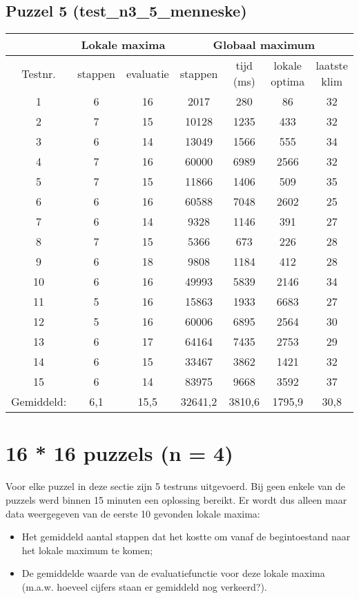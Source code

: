 \documentclass[]{report}
\begin{document}
\begin{appendices}
\subsection{Puzzel 5 (test\_n3\_5\_menneske)}
\begin{tabular}{|c||c|c||c|c|c|c|}
\hline  & \multicolumn{2}{|c||}{Lokale maxima} & \multicolumn{4}{|c|}{Globaal maximum}  \\ 
\hline Testnr. & stappen & evaluatie & stappen & tijd (ms) & lokale optima & laatste klim \\ 
\hline \hline	1	&	6	&	16	&	2017	&	280	&	86	&	32	\\
\hline	2	&	7	&	15	&	10128	&	1235	&	433	&	32	\\
\hline	3	&	6	&	14	&	13049	&	1566	&	555	&	34	\\
\hline	4	&	7	&	16	&	60000	&	6989	&	2566	&	32	\\
\hline	5	&	7	&	15	&	11866	&	1406	&	509	&	35	\\
\hline	6	&	6	&	16	&	60588	&	7048	&	2602	&	25	\\
\hline	7	&	6	&	14	&	9328	&	1146	&	391	&	27	\\
\hline	8	&	7	&	15	&	5366	&	673	&	226	&	28	\\
\hline	9	&	6	&	18	&	9808	&	1184	&	412	&	28	\\
\hline	10	&	6	&	16	&	49993	&	5839	&	2146	&	34	\\
\hline	11	&	5	&	16	&	15863	&	1933	&	6683	&	27	\\
\hline	12	&	5	&	16	&	60006	&	6895	&	2564	&	30	\\
\hline	13	&	6	&	17	&	64164	&	7435	&	2753	&	29	\\
\hline	14	&	6	&	15	&	33467	&	3862	&	1421	&	32	\\
\hline	15	&	6	&	14	&	83975	&	9668	&	3592	&	37	\\
\hline \hline Gemiddeld: & 6,1 & 15,5 & 32641,2 & 3810,6 & 1795,9 & 30,8 \\ 
\hline 
\end{tabular}
\section{16 * 16 puzzels (n = 4)}
Voor elke puzzel in deze sectie zijn 5 testruns uitgevoerd. Bij geen enkele van de puzzels werd binnen 15 minuten een oplossing bereikt. Er wordt dus alleen maar data weergegeven van de eerste 10 gevonden lokale maxima:
\begin{itemize}
\item Het gemiddeld aantal stappen dat het kostte om vanaf de begintoestand naar het lokale maximum te komen;
\item De gemiddelde waarde van de evaluatiefunctie voor deze lokale maxima (m.a.w. hoeveel cijfers staan er gemiddeld nog verkeerd?).
\end{itemize}

\end{appendices}
\end{document}
